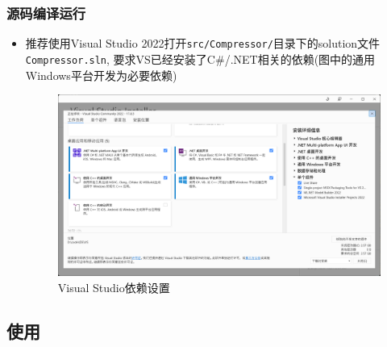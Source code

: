 \documentclass{article}
\begin{document}
\subsubsection{源码编译运行}
\begin{itemize}
    \item 推荐使用Visual Studio 2022打开\texttt{src/Compressor/}目录下的solution文件\texttt{Compressor.sln}, 要求VS已经安装了C\#/.NET相关的依赖(图中的通用Windows平台开发为必要依赖)
    \begin{figure}[H]
        \centering
        \includegraphics[width=0.6\linewidth]{assets/image-1.png}
        \caption{Visual Studio依赖设置}
    \end{figure}
\end{itemize}

\subsection{使用}
\end{document}
